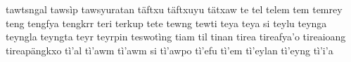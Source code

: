 tawtsngal\hspace{2mm}
tawsìp\hspace{2mm}
tawsyuratan\hspace{2mm}
täftxu\hspace{2mm}
täftxuyu\hspace{2mm}
tätxaw\hspace{2mm}
te\hspace{2mm}
tel\hspace{2mm}
telem\hspace{2mm}
tem\hspace{2mm}
temrey\hspace{2mm}
teng\hspace{2mm}
tengfya\hspace{2mm}
tengkrr\hspace{2mm}
teri\hspace{2mm}
terkup\hspace{2mm}
tete\hspace{2mm}
tewng\hspace{2mm}
tewti\hspace{2mm}
teya\hspace{2mm}
teya si\hspace{2mm}
teylu\hspace{2mm}
teynga\hspace{2mm}
teyngla\hspace{2mm}
teyngta\hspace{2mm}
teyr\hspace{2mm}
teyrpin\hspace{2mm}
teswotìng\hspace{2mm}
tiam\hspace{2mm}
til\hspace{2mm}
tinan\hspace{2mm}
tirea\hspace{2mm}
tireafya'o\hspace{2mm}
tireaioang\hspace{2mm}
tireapängkxo\hspace{2mm}
tì'al\hspace{2mm}
tì'awm\hspace{2mm}
tì'awm si\hspace{2mm}
tì'awpo\hspace{2mm}
tì'efu\hspace{2mm}
tì'em\hspace{2mm}
tì'eylan\hspace{2mm}
tì'eyng\hspace{2mm}
tì'i'a\hspace{2mm}
